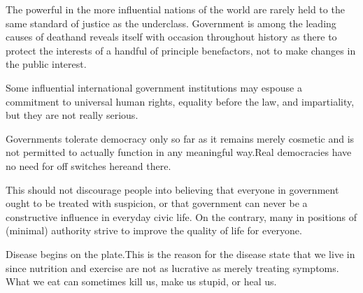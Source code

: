 
The powerful in the more influential nations of the world are rarely held to the same standard of justice as the underclass.
Government is among the leading causes of death and reveals itself with occasion throughout history as there to protect the interests of a handful of principle benefactors,
\footnotecite[wilson2007]
\footnotecite[bowie2012]
\footnotecite[favel2008]
not to make changes in the public interest.

Some influential international government institutions may espouse a commitment to universal human rights, equality before the law, and impartiality, but they are not really serious.

Governments tolerate democracy only so far as it remains merely cosmetic and is not permitted to actually function in any meaningful way. Real democracies have no need for off switches here and there. 

This should not discourage people into believing that everyone in government ought to be treated with suspicion, or that government can never be a constructive influence in everyday civic life. On the contrary, many in positions of (minimal) authority strive to improve the quality of life for everyone.


Disease begins on the plate. This is the reason for the disease state that we live in since nutrition and exercise are not as lucrative as merely treating symptoms. What we eat can sometimes kill us,
make us stupid,
or heal us.
\footnotecite[cavusoglu2009]

